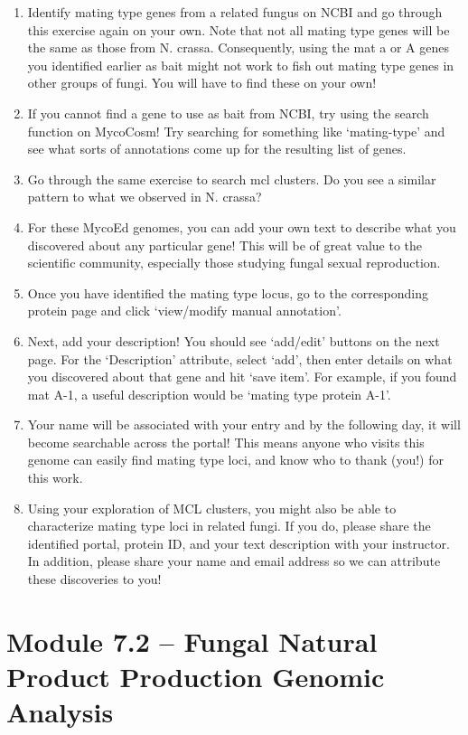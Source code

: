 \documentclass[
  letterpaper,
  DIV=11,
  numbers=noendperiod]{scrreprt}
\providecommand{\tightlist}{%
  \setlength{\itemsep}{0pt}\setlength{\parskip}{0pt}}
\begin{document}
\begin{enumerate}
\def\labelenumi{\arabic{enumi}.}
\tightlist
\item
  Identify mating type genes from a related fungus on NCBI and go
  through this exercise again on your own. Note that not all mating type
  genes will be the same as those from N. crassa. Consequently, using
  the mat a or A genes you identified earlier as bait might not work to
  fish out mating type genes in other groups of fungi. You will have to
  find these on your own!
\item
  If you cannot find a gene to use as bait from NCBI, try using the
  search function on MycoCosm! Try searching for something like
  `mating-type' and see what sorts of annotations come up for the
  resulting list of genes.
\item
  Go through the same exercise to search mcl clusters. Do you see a
  similar pattern to what we observed in N. crassa?
\item
  For these MycoEd genomes, you can add your own text to describe what
  you discovered about any particular gene! This will be of great value
  to the scientific community, especially those studying fungal sexual
  reproduction.
\item
  Once you have identified the mating type locus, go to the
  corresponding protein page and click `view/modify manual annotation'.
\item
  Next, add your description! You should see `add/edit' buttons on the
  next page. For the `Description' attribute, select `add', then enter
  details on what you discovered about that gene and hit `save item'.
  For example, if you found mat A-1, a useful description would be
  `mating type protein A-1'.
\item
  Your name will be associated with your entry and by the following day,
  it will become searchable across the portal! This means anyone who
  visits this genome can easily find mating type loci, and know who to
  thank (you!) for this work.
\item
  Using your exploration of MCL clusters, you might also be able to
  characterize mating type loci in related fungi. If you do, please
  share the identified portal, protein ID, and your text description
  with your instructor. In addition, please share your name and email
  address so we can attribute these discoveries to you!
\end{enumerate}

\section*{Module 7.2 -- Fungal Natural Product Production Genomic
Analysis}\label{module-7.2-fungal-natural-product-production-genomic-analysis}
\end{document}
